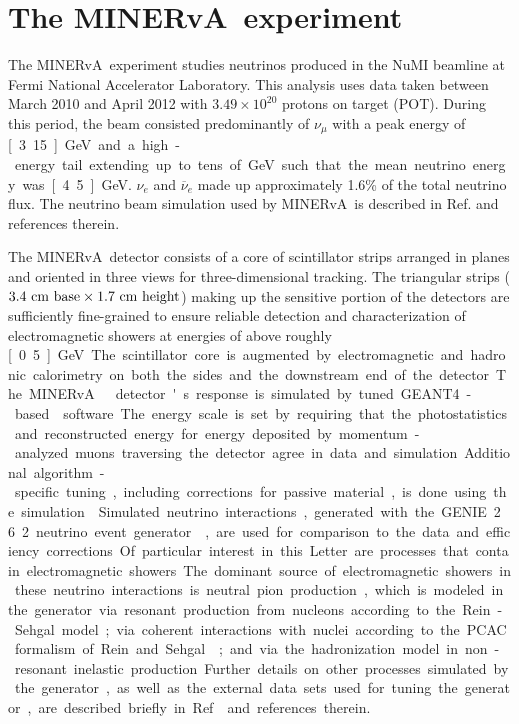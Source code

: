 \documentclass[%
preprint,
 amsmath,amssymb,
 aps,
]{revtex4-1}
\newcommand{\minerva}{\mbox{MINERvA}}
\newcommand{\numu}[0]{\nu_{\mu}}
\newcommand{\nuebar}[0]{\overline{\nu}_{e}}
\newcommand{\nue}[0]{\nu_{e}}
\begin{document}
\section{\label{ExptData}The \minerva\ experiment}

The \minerva\ experiment studies neutrinos produced in the NuMI
beamline at Fermi National Accelerator Laboratory. This analysis uses data taken between March 2010 and April 2012 with $3.49\times 10^{20}$ protons on target (POT).\cite{NUMIref} During this period, the beam consisted predominantly of $\numu$ with a peak energy of \unit[3.15]{GeV} and a high-energy tail extending up to tens of GeV such that the mean neutrino energy was \unit[4.5]{GeV}.  $\nue$ and $\nuebar$ made up approximately 1.6\% of the total neutrino flux.  The neutrino beam simulation used by \minerva\ is described in Ref. \cite{minervaNueCCQE} and references therein.


The \minerva\ detector \cite{MINERvA_NIM,MINERVA_DAQ} consists of a core of scintillator strips arranged in planes and oriented in three views for three-dimensional tracking.  The triangular strips ($3.4~{\rm cm\ base} \times 1.7~{\rm cm\ height}$) making up the sensitive portion of the detectors are sufficiently fine-grained  
to ensure reliable detection and characterization of electromagnetic showers at energies of above roughly \unit[0.5]{GeV}.  The scintillator core is augmented by electromagnetic and hadronic calorimetry on both the sides and the downstream end of the detector.
The \minerva\ detector's response is simulated by tuned GEANT4-based\cite{Agostinelli,Allison} software.  The energy scale is set by requiring that the photostatistics and reconstructed energy for energy deposited by momentum-analyzed muons traversing the detector agree in data and simulation.  Additional algorithm-specific tuning, including corrections for passive material, is done using the simulation \cite{MINERvA_NIM}.


Simulated neutrino interactions, generated with the GENIE 2.6.2 neutrino event generator \cite{GENIE262}, are used for comparison to the data and efficiency corrections.  Of particular interest in this Letter are processes that contain electromagnetic showers.  The dominant source of electromagnetic showers in these neutrino interactions is neutral pion production, which is modeled in the generator via resonant production from nucleons according to the Rein-Sehgal model; via coherent interactions with nuclei according to the PCAC formalism of Rein and Sehgal \cite{RS}; and via the hadronization model in non-resonant inelastic production.  Further details on other processes simulated by the generator, as well as the external data sets used for tuning the generator, are described briefly in Ref. \cite{minervaNueCCQE} and references therein. 
\end{document}
